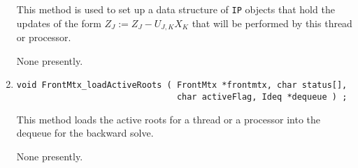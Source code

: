 \begin{enumerate}
This method is used to set up a data structure of {\tt IP} objects
that hold the updates of the form
$Z_J := Z_J - U_{J,K} X_K$
that will be performed by this thread or processor.
\par {}
None presently.
\item
\begin{verbatim}
void FrontMtx_loadActiveRoots ( FrontMtx *frontmtx, char status[],
                                char activeFlag, Ideq *dequeue ) ;
\end{verbatim}
This method loads the active roots for a thread or a processor into
the dequeue for the backward solve.
\par {}
None presently.
\end{enumerate}
\par
